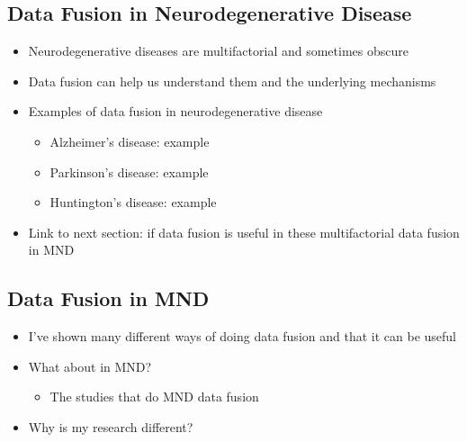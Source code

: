 \subsection{Data Fusion in Neurodegenerative Disease}

\begin{itemize}
    \item Neurodegenerative diseases are multifactorial and sometimes obscure
    \item Data fusion can help us understand them and the underlying mechanisms
    \item Examples of data fusion in neurodegenerative disease
    \begin{itemize}
        \item Alzheimer's disease: example
        \item Parkinson's disease: example
        \item Huntington's disease: example
    \end{itemize}
    \item Link to next section: if data fusion is useful in these multifactorial data fusion in MND
\end{itemize}

\subsection{Data Fusion in MND}

\begin{itemize}
    \item I've shown many different ways of doing data fusion and that it can be useful
    \item What about in MND?
    \begin{itemize}
        \item The studies that do MND data fusion
    \end{itemize}
    \item Why is my research different?
\end{itemize}